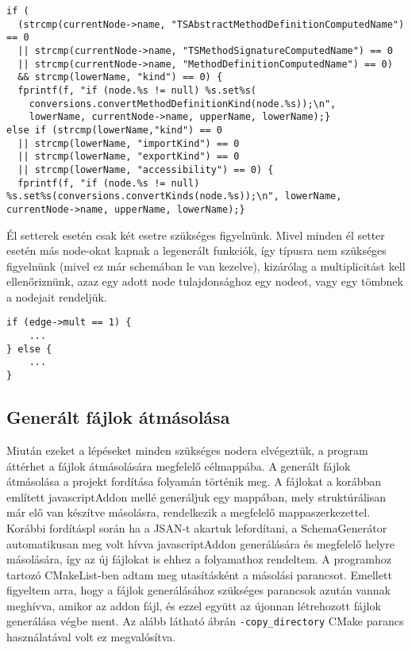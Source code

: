 \begin{lstlisting}[caption={Attribútum szűrésről példa},label={lst:attributefilter}, style={CStyle},basicstyle=\fontsize{9}{11}\selectfont\ttfamily]
if (
  (strcmp(currentNode->name, "TSAbstractMethodDefinitionComputedName") == 0 
  || strcmp(currentNode->name, "TSMethodSignatureComputedName") == 0 
  || strcmp(currentNode->name, "MethodDefinitionComputedName") == 0) 
  && strcmp(lowerName, "kind") == 0) {
  fprintf(f, "if (node.%s != null) %s.set%s(
    conversions.convertMethodDefinitionKind(node.%s));\n", 
    lowerName, currentNode->name, upperName, lowerName);}
else if (strcmp(lowerName,"kind") == 0 
  || strcmp(lowerName, "importKind") == 0 
  || strcmp(lowerName, "exportKind") == 0 
  || strcmp(lowerName, "accessibility") == 0) {
  fprintf(f, "if (node.%s != null) %s.set%s(conversions.convertKinds(node.%s));\n", lowerName, currentNode->name, upperName, lowerName);}
\end{lstlisting}

Él setterek esetén csak két esetre szükséges figyelnünk. Mivel minden él setter esetén más node-okat kapnak a legenerált funkciók, így típusra nem szükséges figyelnünk (mivel ez már schemában le van kezelve), kizárólag a multiplicitást kell ellenőriznünk, azaz egy adott node tulajdonsághoz egy nodeot, vagy egy tömbnek a nodejait rendeljük.

\begin{lstlisting}[caption={Él szetterek fájlba írása},label={lst:edgefilter}, style={CStyle}]
if (edge->mult == 1) {
    ...
} else {
    ...
}
\end{lstlisting}

\subsection{Generált fájlok átmásolása}

Miután ezeket a lépéseket minden szükséges nodera elvégeztük, a program áttérhet a fájlok átmásolására megfelelő célmappába.
A generált fájlok átmásolása a projekt fordítása folyamán történik meg. A fájlokat a korábban említett javascriptAddon mellé generáljuk egy mappában, mely struktúrálisan már elő van készítve másolásra, rendelkezik a megfelelő mappaszerkezettel. Korábbi fordításpl során ha a JSAN-t akartuk lefordítani, a SchemaGenerátor automatikusan meg volt hívva javascriptAddon generálására és megfelelő helyre másolására, így az új fájlokat is ehhez a folyamathoz rendeltem. A programhoz tartozó CMakeList-ben adtam meg utasításként a másolási parancsot. Emellett figyeltem arra, hogy a fájlok generálásához szükséges parancsok azután vannak meghívva, amikor az addon fájl, és ezzel együtt az újonnan létrehozott fájlok generálása végbe ment.
Az alább látható ábrán \texttt{-copy\_directory} CMake parancs használatával volt ez megvalósítva.

